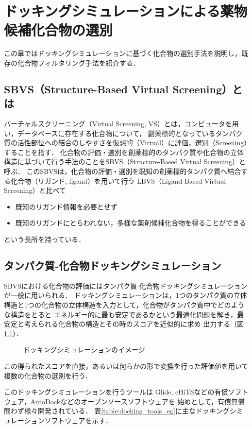 \chapter{ドッキングシミュレーションによる薬物候補化合物の選別}
この章ではドッキングシミュレーションに基づく化合物の選別手法を説明し，既存の化合物フィルタリング手法を紹介する．

\section{SBVS（Structure-Based Virtual Screening）とは}
バーチャルスクリーニング（Virtual Screening, VS）とは，コンピュータを用い，データベースに存在する化合物について，
創薬標的となっているタンパク質の活性部位への結合のしやすさを仮想的（Virtual）に評価，選別（Screening）することを指す．
化合物の評価・選別を創薬標的のタンパク質や化合物の立体構造に基づいて行う手法のことをSBVS（Structure-Based Virtual Screening）と呼ぶ．
このSBVSは，化合物の評価・選別を既知の創薬標的タンパク質へ結合する化合物（リガンド, ligand）を用いて行う
LBVS（Ligand-Based Virtual Screening）と比べて
\begin{itemize}
\item 既知のリガンド情報を必要とせず
\item 既知のリガンドにとらわれない，多様な薬剤候補化合物を得ることができる
\end{itemize}
という長所を持っている．

\section{タンパク質-化合物ドッキングシミュレーション}
SBVSにおける化合物の評価にはタンパク質-化合物ドッキングシミュレーションが一般に用いられる．
ドッキングシミュレーションは，1つのタンパク質の立体構造と1つの化合物の立体構造を入力として，化合物がタンパク質中でどのような構造をとると
エネルギー的に最も安定であるかという最適化問題を解き，最安定と考えられる化合物の構造とその時のスコアを近似的に求め
出力する（図\ref{fig:docking}）．
\begin{figure}[tb]
 \begin{center}
  \caption{ドッキングシミュレーションのイメージ}
  \label{fig:docking}
 \end{center}
\end{figure}
この得られたスコアを直接，あるいは何らかの形で変換を行った評価値を用いて複数の化合物の選別を行う．

このドッキングシミュレーションを行うツールは
Glide\cite{Friesner2004}, eHiTS\cite{Zsoldos2007}などの有償ソフトウェア，AutoDock\cite{Morris2009}などのオープンソースソフトウェアを
始めとして，有償無償問わず様々開発されている．
表\ref{table:docking_tools_eg}に主なドッキングシミュレーションソフトウェアを示す．

